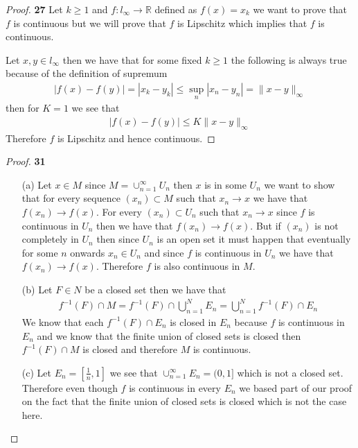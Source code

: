 \documentclass[11pt]{article}
\newcommand{\R}{\mathbb{R}}
\theoremstyle{definition}
\begin{document}
    \begin{proof}{\textbf{27}}
        Let $k \geq 1$ and $f:l_\infty \to \R$ defined as $f(x) = x_k$ we want
        to prove that $f$ is continuous but we will prove that $f$ is Lipschitz
        which implies that $f$ is continuous.

        Let $x,y \in l_\infty$ then we have that for some fixed $k \geq 1$ the
        following is always true because of the definition of supremum
        \begin{align*}
            |f(x) - f(y)| = |x_k - y_k| \leq \sup_n |x_n - y_n| = \|x -y\|_\infty
        \end{align*}
        then for $K = 1$ we see that 
        \begin{align*}
            |f(x) - f(y)|  \leq K \|x -y\|_\infty
        \end{align*}
        Therefore $f$ is Lipschitz and hence continuous.
    \end{proof}
\cleardoublepage
    \begin{proof}{\textbf{31}}
    \begin{itemize}
    \item [(a)] Let $x \in M$ since $M = \cup_{n=1}^\infty U_n$ then $x$ is in
    some $U_n$ we want to show that for every sequence $(x_n) \subset M$ such
    that $x_n \to x$ we have that $f(x_n) \to f(x)$. For every
    $(x_n) \subset U_n$ such that $x_n \to x$ since $f$ is continuous in $U_n$
    then we have that $f(x_n) \to f(x)$. But if $(x_n)$ is not completely in
    $U_n$ then since $U_n$ is an open set it must happen that eventually
    for some $n$ onwards $x_n \in U_n$ and since 
    $f$ is continuous in $U_n$ we have that $f(x_n) \to f(x)$. Therefore
    $f$ is also continuous in $M$.

    \item [(b)] Let $F \in N$ be a closed set then we have that
    \begin{align*}
        f^{-1}(F) \cap M = f^{-1}(F) \cap \bigcup_{n=1}^N E_n = \bigcup_{n=1}^N f^{-1}(F) \cap E_n 
    \end{align*}
    We know that each $f^{-1}(F) \cap E_n$ is closed in $E_n$ because $f$ is
    continuous in $E_n$ and we know that the finite union of closed sets is
    closed then $f^{-1}(F) \cap M$ is closed and therefore $M$ is continuous. 

    \item [(c)] Let $E_n = [\frac{1}{n}, 1]$ we see that
    $\cup_{n=1}^\infty E_n = (0,1]$ which is not a closed set. Therefore even
    though $f$ is continuous in every $E_n$ we based part of our proof
    on the fact that the finite union of closed sets is closed which is not
    the case here.
    \end{itemize}
    \end{proof}
\end{document}

